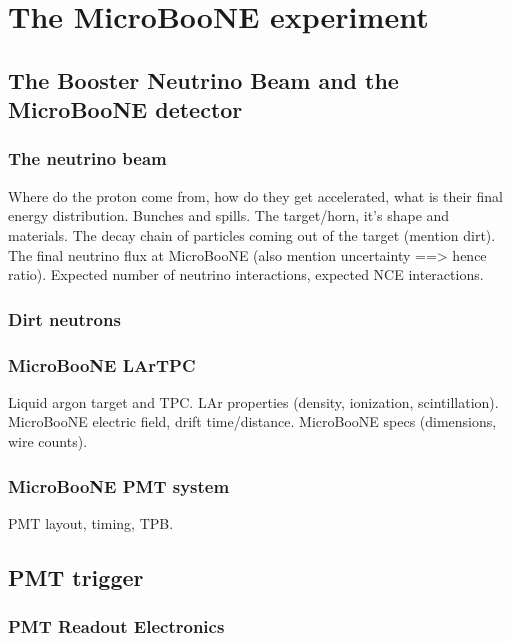 \section{The MicroBooNE experiment}\label{microboone}

\subsection{The Booster Neutrino Beam and the MicroBooNE detector}\label{beam}
  \subsubsection{The neutrino beam}
    Where do the proton come from, how do they get accelerated, what is their final energy distribution.
    Bunches and spills.
    The target/horn, it's shape and materials.
    The decay chain of particles coming out of the target (mention dirt).
    The final neutrino flux at MicroBooNE (also mention uncertainty ==> hence ratio).
    Expected number of neutrino interactions, expected NCE interactions.
  \subsubsection{Dirt neutrons}
  \subsubsection{MicroBooNE LArTPC}
    Liquid argon target and TPC.
    LAr properties (density, ionization, scintillation).
    MicroBooNE electric field, drift time/distance.
    MicroBooNE specs (dimensions, wire counts).
  \subsubsection{MicroBooNE PMT system}
    PMT layout, timing, TPB.

\subsection{PMT trigger}\label{daq}
  \subsubsection{PMT Readout Electronics}
